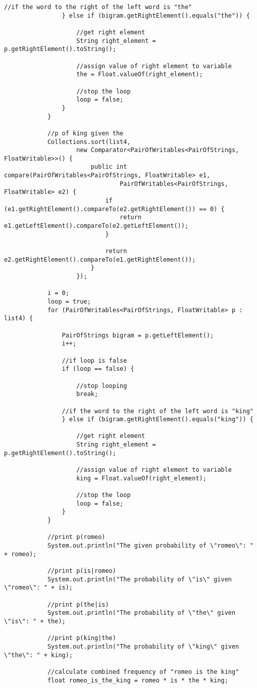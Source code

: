 \documentclass{article} %
\begin{document}
\begin{lstlisting}[style=Java]
				//if the word to the right of the left word is "the"
				} else if (bigram.getRightElement().equals("the")) {
					
					//get right element
					String right_element = p.getRightElement().toString();
					
					//assign value of right element to variable
					the = Float.valueOf(right_element);
					
					//stop the loop
					loop = false;
				}
			}
			
			//p of king given the
			Collections.sort(list4,
					new Comparator<PairOfWritables<PairOfStrings, FloatWritable>>() {
						public int compare(PairOfWritables<PairOfStrings, FloatWritable> e1,
								PairOfWritables<PairOfStrings, FloatWritable> e2) {
							if (e1.getRightElement().compareTo(e2.getRightElement()) == 0) {
								return e1.getLeftElement().compareTo(e2.getLeftElement());
							}

							return e2.getRightElement().compareTo(e1.getRightElement());
						}
					});

			i = 0;
			loop = true;
			for (PairOfWritables<PairOfStrings, FloatWritable> p : list4) {
				
				PairOfStrings bigram = p.getLeftElement();
				i++;
				
				//if loop is false
				if (loop == false) {
					
					//stop looping
					break;
				
				//if the word to the right of the left word is "king"
				} else if (bigram.getRightElement().equals("king")) {
					
					//get right element
					String right_element = p.getRightElement().toString();
					
					//assign value of right element to variable
					king = Float.valueOf(right_element); 
					
					//stop the loop
					loop = false;
				}
			}
			
			//print p(romeo)
			System.out.println("The given probability of \"romeo\": " + romeo);
			
			//print p(is|romeo)
			System.out.println("The probability of \"is\" given \"romeo\": " + is);
			
			//print p(the|is)
			System.out.println("The probability of \"the\" given \"is\": " + the);
			
			//print p(king|the)
			System.out.println("The probability of \"king\" given \"the\": " + king);
			
			//calculate combined frequency of "romeo is the king"
			float romeo_is_the_king = romeo * is * the * king;
			

\end{lstlisting}
\end{document}
